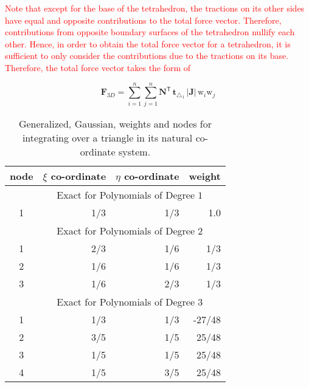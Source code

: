 \textcolor{red}{Note that except for the base of the tetrahedron, the tractions on its other sides have equal and opposite contributions to the total force vector. Therefore, contributions from opposite boundary surfaces of the tetrahedron nullify each other. Hence, in order to obtain the total force vector for a tetrahedron, it is sufficient to only consider the contributions due to the tractions on its base. Therefore, the total force vector takes the form of}

\begin{equation}
\mathbf{F}_{3D} = \sum_{i=1}^{n} \sum_{j=1}^{n} \mathbf{N}^{\mathsf{T}} \, \mathbf{t}_{\triangle_{1}} \,|\mathbf{J}| \, \mathrm{w}_i \mathrm{w}_j 
\end{equation}



\begin{table}
	\centering
	\begin{tabular}{|c|rrr|}
		\hline
		node & $\xi$ co-ordinate   & 
		$\eta$ co-ordinate & weight \\   \hline        
		& \multicolumn{3}{|c|}{Exact for Polynomials of Degree $1^{\phantom{|^|}}$} \\ 
		\hline
		1 & 1/3 & 1/3 & 1.0 \\ 
		\hline
		& \multicolumn{3}{|c|}{Exact for Polynomials of Degree $2^{\phantom{|^|}}$} \\ 
		\hline
		1 & 2/3 & 1/6 & 1/3\\
		2 & 1/6 & 1/6 & 1/3\\
		3 & 1/6 & 2/3 & 1/3\\ 
		\hline
		& \multicolumn{3}{|c|}{Exact for Polynomials of Degree $3^{\phantom{|^|}}$} \\ \hline
		1 & 1/3 & 1/3 & -27/48 \\
		2 & 3/5 & 1/5 & 25/48 \\
		3 & 1/5 & 1/5 & 25/48 \\ 
		4 & 1/5 & 3/5 & 25/48 \\
		\hline
	\end{tabular}
	\caption{Generalized, Gaussian, weights and nodes for integrating over a triangle in its natural co-ordinate system.}
	\label{tabGaussPointsTriangle}
\end{table}

